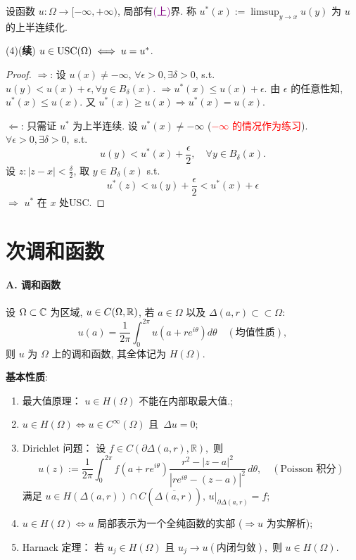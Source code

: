 \begin{definition}
    设函数 $u:\Omega \to [-\infty ,+\infty )$, 局部有\textcolor{purple}{(上)}界. 称 $u^{*}(x):=\limsup _{y \to x}u(y)$ 为 $u$ 的上半连续化.   
\end{definition}
(4)(\textbf{续}) $u \in \operatorname{USC}(\Omega ) \iff u=u^{*}$. 
\begin{proof}
    $\Rightarrow $: 设 $u(x) \neq -\infty $, $\forall \epsilon >0, \exists \delta >0$, s.t. $u(y) <u(x)+\epsilon , \forall y \in B_{\delta }(x)$. $\Rightarrow u^*(x) \leq u(x)+\epsilon $.  由 $\epsilon $ 的任意性知, $u^*(x) \leq u(x)$. 又 $u^*(x) \geq u(x) \Rightarrow u^*(x)=u(x)$.
    
    $\Leftarrow $: 只需证 $u^*$ 为上半连续. 
    设 $u^*(x) \neq -\infty $ (\textcolor{red}{$-\infty $ 的情况作为练习}).   
    $\forall \epsilon >0, \exists \delta >0,$ s.t. 
    $$ u(y)<u^*(x)+\frac{\epsilon }{2}, \quad \forall y \in B_{\delta  }(x) .$$ 
    设 $z:|z-x|< \frac{\delta }{2}$, 取 $y \in B_{\delta }(x)$ s.t. 
    $$ u^*(z) < u(y)+\frac{\epsilon }{2} < u^*(x)+\epsilon  $$
    $\Rightarrow $ $u^*$ 在 $x$ 处USC.     
\end{proof}




\section{次调和函数}

\paragraph{A. 调和函数}
\begin{definition}
    设 $\Omega \subset {\mathbb C}$ 为区域, $u \in C(\Omega , {\mathbb R})$, 若 $a \in \Omega $ 以及 $\Delta (a,r) \subset \subset \Omega $: 
    $$ u(a)=\frac{1}{2 \pi } \int_{0}^{2 \pi } u(a+r e^{i \theta }) d \theta \quad (\text{均值性质}) ,$$    
    则 $u$ 为 $\Omega $ 上的调和函数, 其全体记为 $H(\Omega )$.   
\end{definition}

\noindent\textbf{基本性质}:
\begin{enumerate}
  \item 最大值原理：
  \(
    u \in H(\Omega) \text{ 不能在内部取最大值}.
  \);
  \item
  \(
    u \in H(\Omega)
    \Longleftrightarrow
    u \in C^{\infty }(\Omega) \text{ 且 } \,\Delta u = 0;
  \)
  \item Dirichlet 问题：
  设
  \(
    f \in C(\partial \Delta(a,r), \mathbb{R}),
  \)
  则
  \[
    u(z)
    :=
    \frac{1}{2\pi}
    \int_0^{2\pi}
    f(a+re^{i\theta})
    \frac{r^2 - |z-a|^2}{|re^{i\theta}-(z-a)|^2}
    \, d\theta , \quad (\text{Poisson 积分})
  \]
满足
  \(
    u \in H(\Delta(a,r)) \cap C(\overline{\Delta(a,r)}),
    \,
    u|_{\partial \Delta(a,r)} = f 
  \);
  \item
  \(
    u \in H(\Omega)
    \Longleftrightarrow
    u \text{ 局部表示为一个全纯函数的实部}
  \)
   ($\Rightarrow  u$ 为实解析); 
  \item Harnack 定理：
  若
  \(
    u_j \in H(\Omega)
  \)
  且
  \(
    u_j \to  u (\text{内闭匀敛}),
  \)
  则
  \(
    u \in H(\Omega).
  \)
\end{enumerate}

